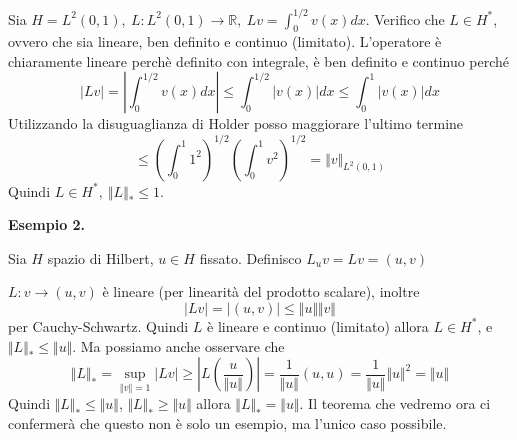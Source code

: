 \documentclass[10pt,a4paper,twoside,openright]{book}
\begin{document}
Sia $\displaystyle H=L^{2}(0,1),\ L:L^{2}(0,1)\rightarrow \mathbb{R},\ Lv=\int ^{1/2}_{0} v(x) dx$. Verifico che $\displaystyle L\in H^{*}$, ovvero che sia lineare, ben definito e continuo (limitato). L'operatore è chiaramente lineare perchè definito con integrale, è ben definito e continuo perché
\begin{equation*}
	| Lv| =\left| \int ^{1/2}_{0} v(x) dx\right| \leqslant \int ^{1/2}_{0}| v(x)| dx\leqslant \int ^{1}_{0}| v(x)| dx
\end{equation*}
Utilizzando la disuguaglianza di Holder posso maggiorare l'ultimo termine
\begin{equation*}
	\leqslant \left(\int ^{1}_{0} 1^{2}\right)^{1/2}\left(\int ^{1}_{0} v^{2}\right)^{1/2} =\Vert v\Vert _{L^{2}(0,1)}
\end{equation*}
Quindi $\displaystyle L\in H^{*},\ \Vert L\Vert _{*} \leqslant 1$.



\textbf{Esempio 2.}

Sia $\displaystyle H$ spazio di Hilbert, $\displaystyle u\in H$ fissato. Definisco $\displaystyle L_{u} v=Lv=(u,v)$

$\displaystyle L:v\rightarrow (u,v)$ è lineare (per linearità del prodotto scalare), inoltre
\begin{equation*}
	| Lv| =| (u,v)| \leqslant \Vert u\Vert \Vert v\Vert 
\end{equation*}
per Cauchy-Schwartz. Quindi $\displaystyle L$ è lineare e continuo (limitato) allora $\displaystyle L\in H^{*}$, e $\displaystyle \Vert L\Vert _{*} \leqslant \Vert u\Vert $. Ma possiamo anche osservare che 
\begin{equation*}
	\Vert L\Vert _{*} =\sup _{\Vert v\Vert =1}| Lv| \geqslant \left| L\left(\frac{u}{\Vert u\Vert }\right)\right| =\frac{1}{\Vert u\Vert }(u,u) =\frac{1}{\Vert u\Vert }\Vert u\Vert ^{2} =\Vert u\Vert 
\end{equation*}
Quindi $\displaystyle \Vert L\Vert _{*} \leqslant \Vert u\Vert $, $\displaystyle \Vert L\Vert _{*} \geqslant \Vert u\Vert $ allora $\displaystyle \Vert L\Vert _{*} =\Vert u\Vert $. Il teorema che vedremo ora ci confermerà che questo non è solo un esempio, ma l'unico caso possibile.
\end{document}
